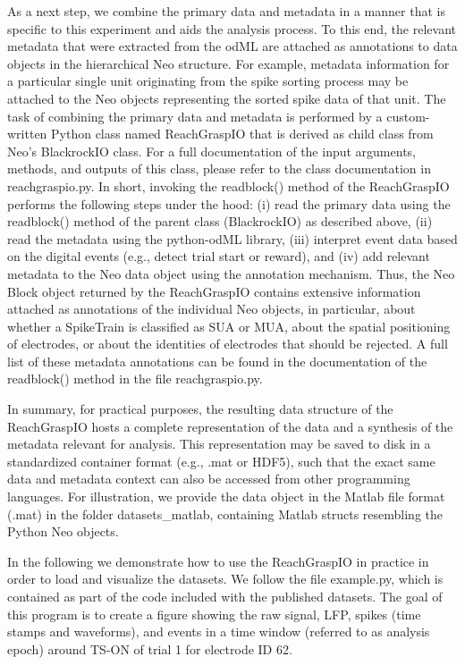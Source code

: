 {As a next step, we combine the primary data and metadata in a manner that is specific to this experiment and aids the analysis process. To this end, the relevant metadata that were extracted from the odML are attached as annotations to data objects in the hierarchical Neo structure. For example, metadata information for a particular single unit originating from the spike sorting process may be attached to the Neo objects representing the sorted spike data of that unit. The task of combining the primary data and metadata is performed by a custom-written Python class named ReachGraspIO that is derived as child class from Neo's BlackrockIO class. For a full documentation of the input arguments, methods, and outputs of this class, please refer to the class documentation in reachgraspio.py. In short, invoking the readblock() method of the ReachGraspIO performs the following steps under the hood: (i) read the primary data using the readblock() method of the parent class (BlackrockIO) as described above, (ii) read the metadata using the python-odML library, (iii) interpret event data based on the digital events (e.g., detect trial start or reward), and (iv) add relevant metadata to the Neo data object using the annotation mechanism. Thus, the Neo Block object returned by the ReachGraspIO contains extensive information attached as annotations of the individual Neo objects, in particular, about whether a SpikeTrain is classified as SUA or MUA, about the spatial positioning of electrodes, or about the identities of electrodes that should be rejected. A full list of these metadata annotations can be found in the documentation of the readblock() method in the file reachgraspio.py.

In summary, for practical purposes, the resulting data structure of the ReachGraspIO hosts a complete representation of the data and a synthesis of the metadata relevant for analysis. This representation may be saved to disk in a standardized container format (e.g., .mat or HDF5), such that the exact same data and metadata context can also be accessed from other programming languages. For illustration, we provide the data object in the Matlab file format (.mat) in the folder datasets\_matlab, containing Matlab structs resembling the Python Neo objects.

In the following we demonstrate how to use the ReachGraspIO in practice in order to load and visualize the datasets. We follow the file example.py, which is contained as part of the code included with the published datasets. The goal of this program is to create a figure showing the raw signal, LFP, spikes (time stamps and waveforms), and events in a time window (referred to as analysis epoch) around TS-ON of trial 1 for electrode ID 62. 

}
